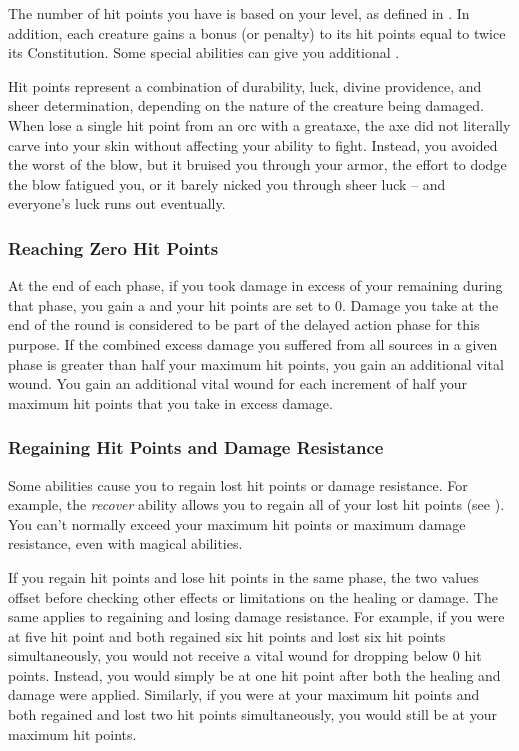         The number of hit points you have is based on your level, as defined in .
        In addition, each creature gains a bonus (or penalty) to its hit points equal to twice its Constitution.
        Some special abilities can give you additional .

         Hit points represent a combination of durability, luck, divine providence, and sheer determination, depending on the nature of the creature being damaged.
        When lose a single hit point from an orc with a greataxe, the axe did not literally carve into your skin without affecting your ability to fight.
        Instead, you avoided the worst of the blow, but it bruised you through your armor, the effort to dodge the blow fatigued you, or it barely nicked you through sheer luck -- and everyone's luck runs out eventually.

        \subsubsection{Reaching Zero Hit Points}\label{Reaching Zero Hit Points}
        At the end of each phase, if you took damage in excess of your remaining  during that phase, you gain a  and your hit points are set to 0.
        Damage you take at the end of the round is considered to be part of the delayed action phase for this purpose.
        If the combined excess damage you suffered from all sources in a given phase is greater than half your maximum hit points, you gain an additional vital wound.
        You gain an additional vital wound for each increment of half your maximum hit points that you take in excess damage.

        \subsubsection{Regaining Hit Points and Damage Resistance}\label{Regaining Hit Points and Damage Resistance}
            Some abilities cause you to regain lost hit points or damage resistance.
            For example, the \textit{recover} ability allows you to regain all of your lost hit points (see ).
            You can't normally exceed your maximum hit points or maximum damage resistance, even with magical abilities.

             If you regain hit points and lose hit points in the same phase, the two values offset before checking other effects or limitations on the healing or damage.
            The same applies to regaining and losing damage resistance.
            For example, if you were at five hit point and both regained six hit points and lost six hit points simultaneously, you would not receive a vital wound for dropping below 0 hit points.
            Instead, you would simply be at one hit point after both the healing and damage were applied.
            Similarly, if you were at your maximum hit points and both regained and lost two hit points simultaneously, you would still be at your maximum hit points.


